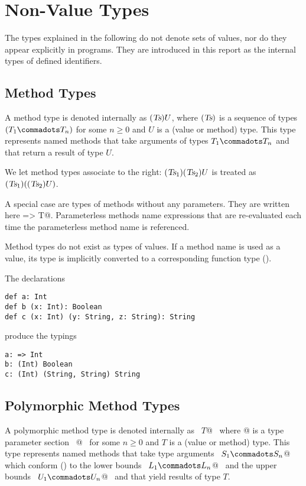 \section{Non-Value Types}
\label{sec:synthetic-types}

The types explained in the following do not denote sets of values, nor
do they appear explicitly in programs. They are introduced in this
report as the internal types of defined identifiers.

\subsection{Method Types}
\label{sec:method-types}

A method type is denoted internally as $(\mbox{\sl Ts})U$, where $(\mbox{\sl Ts})$ is a
sequence of types $(T_1 \commadots T_n)$ for some $n \geq 0$
and $U$ is a (value or method) type.  This type represents named
methods that take arguments of types $T_1 \commadots T_n$ 
and that return a result of type $U$.

We let method types associate to the right: $(\mbox{\sl Ts}_1)(\mbox{\sl Ts}_2)U$ is
treated as $(\mbox{\sl Ts}_1)((\mbox{\sl Ts}_2)U)$.

A special case are types of methods without any parameters. They are
written here \lstinline@=> T@. Parameterless methods name expressions
that are re-evaluated each time the parameterless method name is
referenced.

Method types do not exist as types of values. If a method name is used
as a value, its type is implicitly converted to a corresponding
function type ().

\example The declarations
\begin{lstlisting}
def a: Int
def b (x: Int): Boolean
def c (x: Int) (y: String, z: String): String
\end{lstlisting}
produce the typings
\begin{lstlisting}
a: => Int
b: (Int) Boolean
c: (Int) (String, String) String
\end{lstlisting}

\subsection{Polymorphic Method Types}
\label{sec:poly-types}

A polymorphic method type is denoted internally as ~\lstinline@[$\tps\,$]$T$@~ where
\lstinline@[$\tps\,$]@ is a type parameter section 
~\lstinline@[$a_1$ >: $L_1$ <: $U_1 \commadots a_n$ >: $L_n$ <: $U_n$]@~ 
for some $n \geq 0$ and $T$ is a
(value or method) type.  This type represents named methods that
take type arguments ~\lstinline@$S_1 \commadots S_n$@~ which
conform () to the lower bounds
~\lstinline@$L_1 \commadots L_n$@~ and the upper bounds
~\lstinline@$U_1 \commadots U_n$@~ and that yield results of type $T$.

